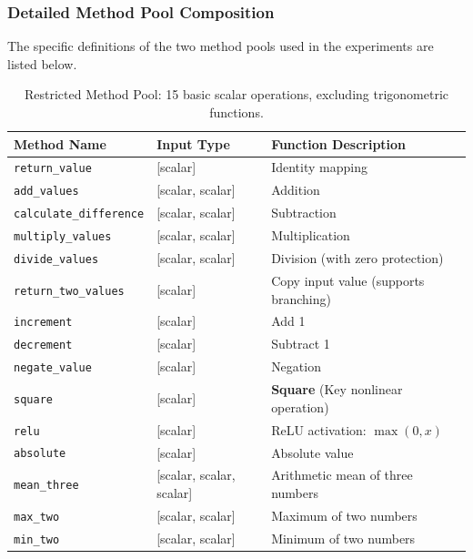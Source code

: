 \subsubsection*{Detailed Method Pool Composition}

The specific definitions of the two method pools used in the experiments are listed below.

\begin{table}[htbp]
\centering
\caption{Restricted Method Pool: 15 basic scalar operations, excluding trigonometric functions.}
\label{tab:method_pool_restricted}
\begin{tabularx}{\linewidth}{@{}l l >{\raggedright\arraybackslash}X@{}}
\toprule
\textbf{Method Name} & \textbf{Input Type} & \textbf{Function Description} \\
\midrule
\texttt{return\_value} & [scalar] & Identity mapping \\
\texttt{add\_values} & [scalar, scalar] & Addition \\
\texttt{calculate\_difference} & [scalar, scalar] & Subtraction \\
\texttt{multiply\_values} & [scalar, scalar] & Multiplication \\
\texttt{divide\_values} & [scalar, scalar] & Division (with zero protection) \\
\texttt{return\_two\_values} & [scalar] & Copy input value (supports branching) \\
\texttt{increment} & [scalar] & Add 1 \\
\texttt{decrement} & [scalar] & Subtract 1 \\
\texttt{negate\_value} & [scalar] & Negation \\
\texttt{square} & [scalar] & \textbf{Square} (Key nonlinear operation) \\
\texttt{relu} & [scalar] & ReLU activation: $\max(0, x)$ \\
\texttt{absolute} & [scalar] & Absolute value \\
\texttt{mean\_three} & [scalar, scalar, scalar] & Arithmetic mean of three numbers \\
\texttt{max\_two} & [scalar, scalar] & Maximum of two numbers \\
\texttt{min\_two} & [scalar, scalar] & Minimum of two numbers \\
\bottomrule
\end{tabularx}
\end{table}

